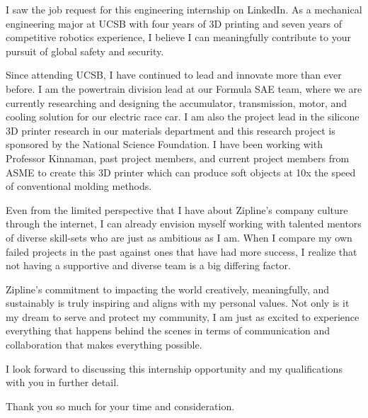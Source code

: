 \documentclass[11pt, letterpaper]{awesome-cv} %
\begin{document}
\makecvheader %

\makelettertitle %


\begin{cvletter}


I saw the job request for this engineering internship on LinkedIn. As a mechanical engineering major at UCSB with four years of 3D printing and seven years of competitive robotics experience, I believe I can meaningfully contribute to your pursuit of global safety and security.




Since attending UCSB, I have continued to lead and innovate more than ever before. I am the powertrain division lead at our Formula SAE team, where we are currently researching and designing the accumulator, transmission, motor, and cooling solution for our electric race car. I am also the project lead in the silicone 3D printer research in our materials department and this research project is sponsored by the National Science Foundation. I have been working with Professor Kinnaman, past project members, and current project members from ASME to create this 3D printer which can produce soft objects at 10x the speed of conventional molding methods.



Even from the limited perspective that I have about Zipline's company culture through the internet, I can already envision myself working with talented mentors of diverse skill-sets who are just as ambitious as I am. When I compare my own failed projects in the past against ones that have had more success, I realize that not having a supportive and diverse team is a big differing factor. 

Zipline's commitment to impacting the world creatively, meaningfully, and sustainably is truly inspiring and aligns with my personal values. Not only is it my dream to serve and protect my community, I am just as excited to experience everything that happens behind the scenes in terms of communication and collaboration that makes everything possible.

I look forward to discussing this internship opportunity and my qualifications with you in further detail.

Thank you so much for your time and consideration.


\end{cvletter}


\makeletterclosing %
\end{document}
